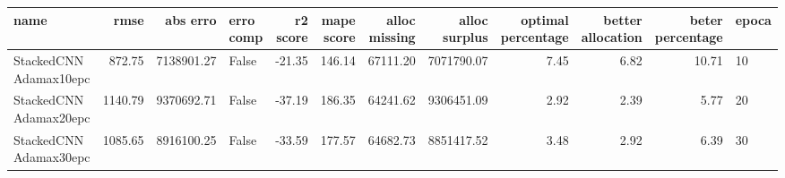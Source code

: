 \begin{tabular}{lrrlrrrrrrrl}
\toprule
name & rmse & abs erro & erro comp & r2 score & mape score & alloc missing & alloc surplus & optimal percentage & better allocation & beter percentage & epoca \\
\midrule
StackedCNN Adamax10epc & 872.75 & 7138901.27 & False & -21.35 & 146.14 & 67111.20 & 7071790.07 & 7.45 & 6.82 & 10.71 & 10 \\
StackedCNN Adamax20epc & 1140.79 & 9370692.71 & False & -37.19 & 186.35 & 64241.62 & 9306451.09 & 2.92 & 2.39 & 5.77 & 20 \\
StackedCNN Adamax30epc & 1085.65 & 8916100.25 & False & -33.59 & 177.57 & 64682.73 & 8851417.52 & 3.48 & 2.92 & 6.39 & 30 \\
\bottomrule
\end{tabular}
